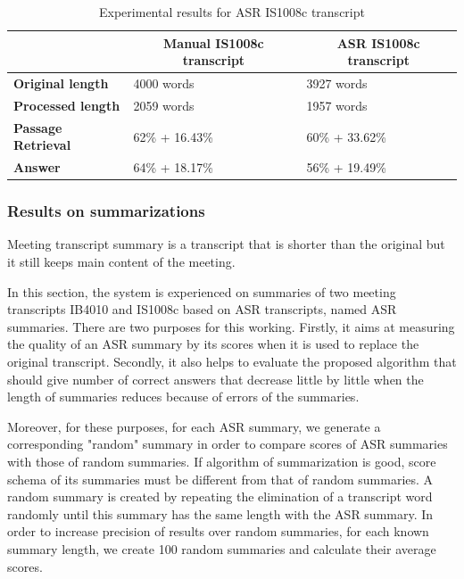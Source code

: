 \documentclass[10pt,a4paper]{article}
\numberwithin{algorithm}{section}  %
\begin{document}
\begin{table}[ht!]
\scriptsize
\caption{Experimental results for ASR IS1008c transcript}
\begin{tabular}{|l|l|l|}
\hline
\textbf{} & \multicolumn{1}{c|}{\textbf{Manual IS1008c transcript}} & \multicolumn{1}{c|}{\textbf{ASR IS1008c transcript}} \\ \hline
\textbf{Original length} & 4000 words & 3927 words \\ \hline
\textbf{Processed length} & 2059 words & 1957 words \\ \hline
\textbf{Passage Retrieval} & 62\% + 16.43\% & 60\% + 33.62\% \\ \hline
\textbf{Answer} & 64\% + 18.17\% & 56\% + 19.49\% \\ \hline
\end{tabular}
\label{tab: Experimental results for ASR IS1008c transcript}
\end{table}

\pagebreak

\subsubsection*{Results on summarizations}
Meeting transcript summary is a transcript that is shorter than the original but it still keeps main content of the meeting.

In this section, the system is experienced on summaries of two meeting transcripts IB4010 and IS1008c based on ASR transcripts, named ASR summaries. There are two purposes for this working. Firstly, it aims at measuring the quality of an ASR summary by its scores when it is used to replace the original transcript. Secondly, it also helps to evaluate the proposed algorithm that should give number of correct answers that decrease little by little when the length of summaries reduces because of errors of the summaries.

Moreover, for these purposes, for each ASR summary, we generate a corresponding "random" summary in order to compare scores of ASR summaries with those of random summaries. If algorithm of summarization is good, score schema of its summaries must be different from that of random summaries. A random summary is created by repeating the elimination of a transcript word randomly until this summary has the same length with the ASR summary. In order to increase precision of results over random summaries, for each known summary length, we create 100 random summaries and calculate their average scores.
\end{document}
